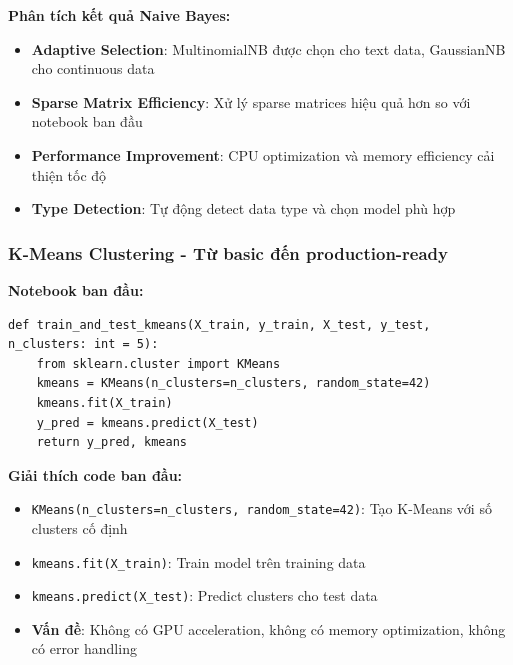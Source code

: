 \textbf{Phân tích kết quả Naive Bayes:}
\begin{itemize}
    \item \textbf{Adaptive Selection}: MultinomialNB được chọn cho text data, GaussianNB cho continuous data
    \item \textbf{Sparse Matrix Efficiency}: Xử lý sparse matrices hiệu quả hơn so với notebook ban đầu
    \item \textbf{Performance Improvement}: CPU optimization và memory efficiency cải thiện tốc độ
    \item \textbf{Type Detection}: Tự động detect data type và chọn model phù hợp
\end{itemize}

\subsubsection{K-Means Clustering - Từ basic đến production-ready}

\textbf{Notebook ban đầu:}
\begin{verbatim}
def train_and_test_kmeans(X_train, y_train, X_test, y_test, n_clusters: int = 5):
    from sklearn.cluster import KMeans
    kmeans = KMeans(n_clusters=n_clusters, random_state=42)
    kmeans.fit(X_train)
    y_pred = kmeans.predict(X_test)
    return y_pred, kmeans
\end{verbatim}

\textbf{Giải thích code ban đầu:}
\begin{itemize}
    \item \texttt{KMeans(n\_clusters=n\_clusters, random\_state=42)}: Tạo K-Means với số clusters cố định
    \item \texttt{kmeans.fit(X\_train)}: Train model trên training data
    \item \texttt{kmeans.predict(X\_test)}: Predict clusters cho test data
    \item \textbf{Vấn đề}: Không có GPU acceleration, không có memory optimization, không có error handling
\end{itemize}

